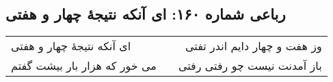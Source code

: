 \begin{center}
\section*{رباعی شماره ۱۶۰: ای آنکه نتیجهٔ چهار و هفتی}
\label{sec:sh160}
\begin{longtable}{l p{0.5cm} r}
ای آنکه نتیجهٔ چهار و هفتی
&&
وز هفت و چهار دایم اندر تفتی
\\
می خور که هزار بار بیشت گفتم
&&
باز آمدنت نیست چو رفتی رفتی
\\
\end{longtable}
\end{center}
